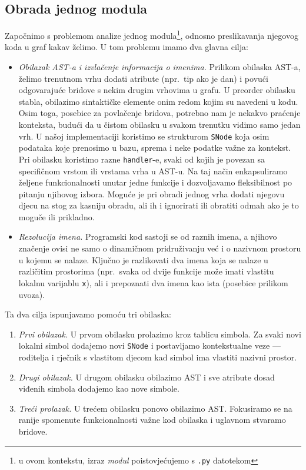 \subsection{Obrada jednog modula}
Započnimo s problemom analize jednog modula\footnote{u ovom kontekstu,
izraz \emph{modul} poistovjećujemo s \texttt{.py} datotekom},
 odnosno preslikavanja njegovog koda u graf kakav želimo. U tom problemu imamo
dva glavna cilja:
\begin{itemize}
\item \textit{Obilazak AST-a i izvlačenje informacija o imenima.} Prilikom obilaska AST-a, želimo trenutnom vrhu
dodati atribute (npr.\ tip ako je dan) i povući odgovarajuće bridove s nekim drugim vrhovima u grafu. U
preorder obilasku stabla, obilazimo sintaktičke elemente onim redom kojim su navedeni u kodu. Osim toga,
posebice za povlačenje bridova, potrebno nam je nekakvo praćenje konteksta, budući da u čistom
obilasku u svakom trenutku vidimo samo jedan vrh. U našoj implementaciji koristimo se strukturom
\texttt{SNode} koja osim podataka koje prenosimo u bazu, sprema i neke podatke važne za kontekst.
Pri obilasku koristimo razne \texttt{handler}-e, svaki od kojih je povezan sa specifičnom
vrstom ili vrstama vrha u AST-u. Na taj način enkapsuliramo željene funkcionalnosti unutar
jedne funkcije i dozvoljavamo fleksibilnost po pitanju njihovog izbora. Moguće je pri
obradi jednog vrha dodati njegovu djecu na stog za kasniju obradu, ali ih i ignorirati ili
obratiti odmah ako je to moguče ili prikladno.

\item \textit{Rezolucija imena.} Programski kod sastoji se od raznih imena, a njihovo značenje ovisi ne samo
o dinamičnom pridruživanju već i o nazivnom prostoru u kojemu se nalaze. Ključno je razlikovati dva
imena koja se nalaze u različitim prostorima (npr.\ svaka od dvije funkcije može imati vlastitu lokalnu
varijablu \texttt{x}), ali i prepoznati dva imena kao ista (posebice prilikom uvoza).
\end{itemize}

Ta dva cilja ispunjavamo pomoću tri obilaska:
\begin{enumerate}
\item \textit{Prvi obilazak.} U prvom obilasku prolazimo kroz tablicu simbola.
	Za svaki novi lokalni simbol dodajemo novi \texttt{SNode} i postavljamo
	kontekstualne veze --- roditelja i rječnik s vlastitom djecom kad simbol
	ima vlastiti nazivni prostor.
\item \textit{Drugi obilazak.} U drugom obilasku obilazimo AST i sve atribute dosad viđenih
	simbola dodajemo kao nove simbole.
\item \textit{Treći prolazak.} U trećem obilasku ponovo obilazimo AST. Fokusiramo se na ranije spomenute
	funkcionalnosti važne kod obilaska i uglavnom stvaramo bridove.
\end{enumerate}


